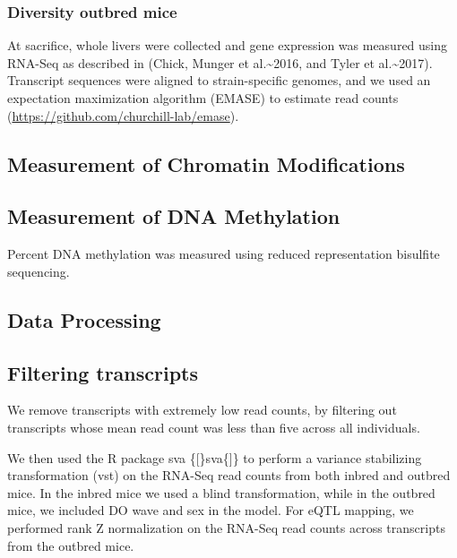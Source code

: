 \documentclass[10pt,letterpaper]{article}
\begin{document}
\hypertarget{diversity-outbred-mice-2}{%
\subsubsection{Diversity outbred mice}\label{diversity-outbred-mice-2}}

At sacrifice, whole livers were collected and gene expression was
measured using RNA-Seq as described in (Chick, Munger et
al.\textasciitilde2016, and Tyler et al.\textasciitilde2017). Transcript
sequences were aligned to strain-specific genomes, and we used an
expectation maximization algorithm (EMASE) to estimate read counts
(\url{https://github.com/churchill-lab/emase}).

\hypertarget{measurement-of-chromatin-modifications}{%
\subsection{Measurement of Chromatin
Modifications}\label{measurement-of-chromatin-modifications}}

\hypertarget{measurement-of-dna-methylation}{%
\subsection{Measurement of DNA
Methylation}\label{measurement-of-dna-methylation}}

Percent DNA methylation was measured using reduced representation
bisulfite sequencing.

\hypertarget{data-processing}{%
\subsection{Data Processing}\label{data-processing}}

\hypertarget{filtering-transcripts}{%
\subsection{Filtering transcripts}\label{filtering-transcripts}}

We remove transcripts with extremely low read counts, by filtering out
transcripts whose mean read count was less than five across all
individuals.

We then used the R package sva \{{[}\}sva\{{]}\} to perform a variance
stabilizing transformation (vst) on the RNA-Seq read counts from both
inbred and outbred mice. In the inbred mice we used a blind
transformation, while in the outbred mice, we included DO wave and sex
in the model. For eQTL mapping, we performed rank Z normalization on the
RNA-Seq read counts across transcripts from the outbred mice.
\end{document}
